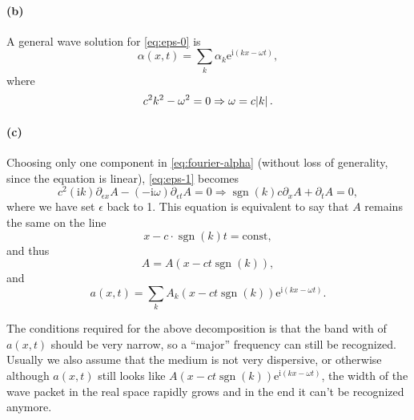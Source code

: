 \documentclass[hyperref, a4paper]{article}
\DeclareMathOperator{\sgn}{sgn}
\newcommand*{\ii}{\mathrm{i}}
\newcommand*{\ee}{\mathrm{e}}
\newcommand*{\const}{\mathrm{const}}
\begin{document}
\paragraph{(b)} A general wave solution for \eqref{eq:eps-0} is 
\begin{equation}
    \alpha(x, t) = \sum_{k} \alpha_k \ee^{\ii (k x - \omega t)},
    \label{eq:fourier-alpha}
\end{equation}
where 
\begin{equation}
    c^2 k^2 - \omega^2 = 0 \Rightarrow
    \omega = c \abs*{k}.
\end{equation}

\paragraph{(c)} Choosing only one component in \eqref{eq:fourier-alpha} 
(without loss of generality, since the equation is linear),
\eqref{eq:eps-1} becomes 
\begin{equation}
    c^2 (\ii k) \partial_{\epsilon x} A - (- \ii \omega) \partial_{\epsilon t} A = 0 
    \Rightarrow \sgn(k) c \partial_x A + \partial_t A = 0,
\end{equation}
where we have set $\epsilon$ back to 1.
This equation is equivalent to say that $A$ remains the same 
on the line 
\begin{equation}
    x - c \cdot \sgn(k) t = \const,
\end{equation}
and thus 
\begin{equation}
    A = A (x - c t \sgn(k)),
\end{equation}
and 
\begin{equation}
    a(x, t) = \sum_k A_k(x - c t \sgn(k)) \ee^{\ii (k x - \omega t)}.
\end{equation}

The conditions required for the above decomposition 
is that the band with of $a(x,  t)$ should be very narrow, 
so a ``major'' frequency can still be recognized.
Usually we also assume that the medium is not very dispersive, 
or otherwise although $a(x, t)$ still looks like 
$A(x - ct \sgn(k)) \ee^{\ii (kx - \omega t)}$,
the width of the wave packet in the real space rapidly grows 
and in the end it can't be recognized anymore.
\end{document}
